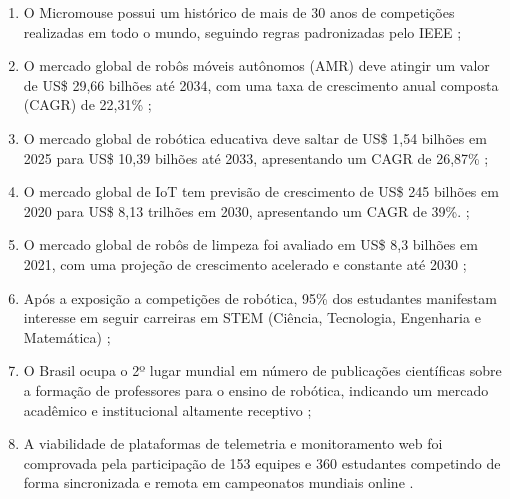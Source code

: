 \begin{enumerate}
    \item O Micromouse possui um histórico de mais de 30 anos de competições realizadas em todo o mundo, seguindo regras padronizadas pelo IEEE \cite{cai2010};
    \item O mercado global de robôs móveis autônomos (AMR) deve atingir um valor de US\$ 29,66 bilhões até 2034, com uma taxa de crescimento anual composta (CAGR) de 22,31\% \cite{precedence2023};
    \item O mercado global de robótica educativa deve saltar de US\$ 1,54 bilhões em 2025 para US\$ 10,39 bilhões até 2033, apresentando um CAGR de 26,87\% \cite{cognitive2026};
    \item O mercado global de IoT tem previsão de crescimento de US\$ 245 bilhões em 2020 para US\$ 8,13 trilhões em 2030, apresentando um CAGR de 39\%. \cite{alsarawi2020};
    \item O mercado global de robôs de limpeza foi avaliado em US\$ 8,3 bilhões em 2021, com uma projeção de crescimento acelerado e constante até 2030 \cite{cleaningrobots2022};
    \item Após a exposição a competições de robótica, 95\% dos estudantes manifestam interesse em seguir carreiras em STEM (Ciência, Tecnologia, Engenharia e Matemática) \cite{chung2021};
    \item O Brasil ocupa o 2º lugar mundial em número de publicações científicas sobre a formação de professores para o ensino de robótica, indicando um mercado acadêmico e institucional altamente receptivo \cite{dutra2025};
    \item A viabilidade de plataformas de telemetria e monitoramento web foi comprovada pela participação de 153 equipes e 360 estudantes competindo de forma sincronizada e remota em campeonatos mundiais online \cite{chung2021}.
\end{enumerate}



